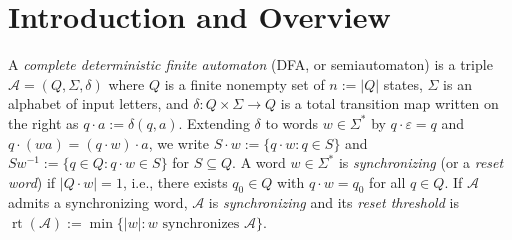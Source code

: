 \documentclass[11pt,a4paper]{article}
\theoremstyle{definition}
\theoremstyle{remark}
\newcommand{\rt}{\operatorname{rt}}
\newcommand{\Z}{\mathbb{Z}}
\newcommand{\R}{\mathbb{R}}
\newcommand{\cA}{\mathcal{A}}
\begin{document}
\begin{abstract}
\begin{enumerate}[label=(\roman*),nosep]
  \item \emph{Non-uniform stationary measures:} we give a unified two-case real-valued proof of exact $(n-1)^2$ for almost-uniform stationary vectors and unconditional degree-$1$ quasi-Eulerian automata, establish the first uniform quadratic bound $14\,\rt(\cA) < 29(n-1)^2$ (and $< 2(n-1)^2$ off $\frac{1}{2}\Z$ and at $\{\frac{1}{2}, \frac{3}{2}\}$) for all two-value stationary vectors with $|X| = 2$ over all $\alpha_0 \in \R_{>0}$ (plus polynomial $O(kn^2)$ bounds for arbitrary $k$ removing both rationality and Berlinkov's $2^k$ factor), and give a self-contained matrix-free dual-subspace proof of Szyku\l a's tier lemma yielding exact $(n-1)^2$ for integer stationary measures up to logarithmic excess $J \le n + \lfloor\log_2 n\rfloor - 4$.
\end{enumerate}
Every theorem in this paper, together with an independent formalization of Zhu's one-cluster theorem and classical foundations, is formally verified in Lean~4.36.0 (Mathlib~v4.36.0) using only standard axioms.
\end{abstract}

\section{Introduction and Overview}
\label{sec:intro}

A \emph{complete deterministic finite automaton} (DFA, or semiautomaton) is a triple $\cA = (Q, \Sigma, \delta)$ where $Q$ is a finite nonempty set of $n := |Q|$ states, $\Sigma$ is an alphabet of input letters, and $\delta : Q \times \Sigma \to Q$ is a total transition map written on the right as $q \cdot a := \delta(q, a)$. Extending $\delta$ to words $w \in \Sigma^*$ by $q \cdot \varepsilon = q$ and $q \cdot (wa) = (q \cdot w) \cdot a$, we write $S \cdot w := \{q \cdot w : q \in S\}$ and $S w^{-1} := \{q \in Q : q \cdot w \in S\}$ for $S \subseteq Q$. A word $w \in \Sigma^*$ is \emph{synchronizing} (or a \emph{reset word}) if $|Q \cdot w| = 1$, i.e., there exists $q_0 \in Q$ with $q \cdot w = q_0$ for all $q \in Q$. If $\cA$ admits a synchronizing word, $\cA$ is \emph{synchronizing} and its \emph{reset threshold} is $\rt(\cA) := \min\{|w| : w \text{ synchronizes } \cA\}$.
\end{document}
